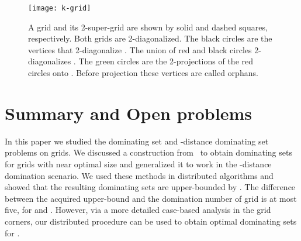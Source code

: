 \documentclass[letterpaper, 10pt, conference]{ieeeconf}
\theoremstyle{definition}
\theoremstyle{remark}
\begin{document}
\begin{figure}[t]
\texttt{[image: k-grid]}
\vspace{-0.5cm}
\caption{A  grid  and its 2-super-grid  are shown by solid and dashed squares, respectively. Both grids are 2-diagonalized. The black circles are the vertices that 2-diagonalize . The union of red and black circles 2-diagonalizes . The green circles are the 2-projections of the red circles onto . Before projection these vertices are called orphans.}
\label{fig:k-grid}
\end{figure}

\section{Summary and Open problems}
\label{sec:conclusion}
In this paper we studied the dominating set and -distance dominating set problems on  grids. We discussed a construction from~\cite{TYC'92} to obtain dominating sets for grids with near optimal size and generalized it to work in the -distance domination scenario. We used these methods in distributed algorithms and showed that the resulting dominating sets are upper-bounded by . The difference between the acquired upper-bound and the domination number of grid is at most five, for  and . However, via a more detailed case-based analysis in the grid corners, our distributed procedure can be used to obtain optimal dominating sets for .
\end{document}
